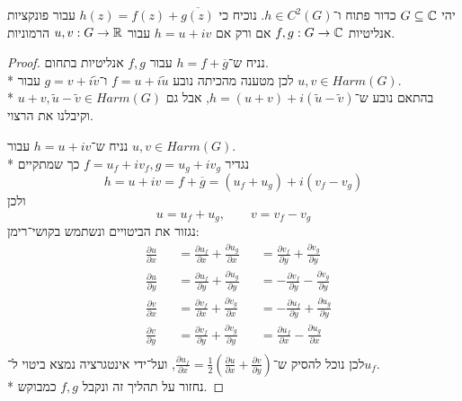 \Question{}
יהי $G \subseteq \mathbb{C}$ כדור פתוח ו־$h \in C^2(G)$.
נוכיח כי $h(z) = f(z) + \overline{g(z)}$ עבור פונקציות אנליטיות $f, g : G \to \mathbb{C}$ אם ורק אם $h = u + i v$ עבור $u, v : G \to \mathbb{R}$ הרמוניות.
\begin{proof}
	נניח ש־$h = f + \overline{g}$ עבור $f, g$ אנליטיות בתחום. \\*
	לכן מטענה מהכיתה נובע $f = u + i \tilde{u}$ ו־$g = v + i \tilde{v}$ עבור $u, v \in Harm(G)$. \\*
	בהתאם נובע ש־$h = (u + v) + i (\tilde{u} - \tilde{v})$, אבל גם $u + v, \tilde{u} - \tilde{v} \in Harm(G)$ וקיבלנו את הרצוי.

	נניח ש־$h = u + i v$ עבור $u, v \in Harm(G)$. \\*
	נגדיר $f = u_f + i v_f, g = u_g + i v_g$ כך שמתקיים
	\[
		h = u + i v = f + \overline{g} = (u_f + u_g) + i (v_f - v_g)
	\]
	ולכן
	\[
		u = u_f + u_g,
		\qquad
		v = v_f - v_g
	\]
	נגזור את הביטויים ונשתמש בקושי־רימן:
	\begin{align*}
		& \frac{\partial u}{\partial x} && = \frac{\partial u_f}{\partial x} + \frac{\partial u_g}{\partial x} && = \frac{\partial v_f}{\partial y} + \frac{\partial v_g}{\partial y} \\
		& \frac{\partial u}{\partial y} && = \frac{\partial u_f}{\partial y} + \frac{\partial u_g}{\partial y} && = -\frac{\partial v_f}{\partial y} - \frac{\partial v_g}{\partial y} \\
		& \frac{\partial v}{\partial x} && = \frac{\partial v_f}{\partial x} + \frac{\partial v_g}{\partial x} && = -\frac{\partial u_f}{\partial y} + \frac{\partial u_g}{\partial y} \\
		& \frac{\partial v}{\partial y} && = \frac{\partial v_f}{\partial y} + \frac{\partial v_g}{\partial y} && = \frac{\partial u_f}{\partial x} - \frac{\partial u_g}{\partial x} \\
	\end{align*}
	לכן נוכל להסיק ש־$\frac{\partial u_f}{\partial x} = \frac{1}{2} (\frac{\partial u}{\partial x} + \frac{\partial v}{\partial y})$, ועל־ידי אינטגרציה נמצא ביטוי ל־$u_f$. \\*
	נחזור על תהליך זה ונקבל $f, g$ כמבוקש.
\end{proof}


